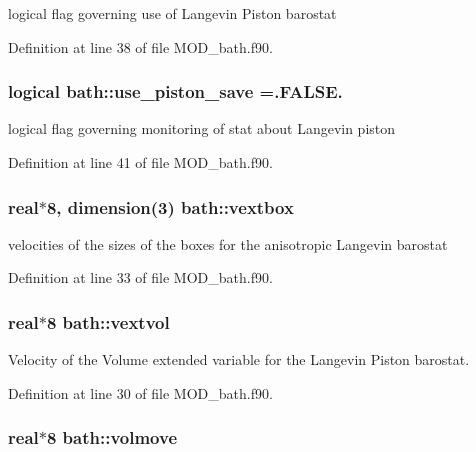 logical flag governing use of Langevin Piston barostat 



Definition at line 38 of file M\-O\-D\-\_\-bath.\-f90.

\hypertarget{classbath_a95eb9a1e66e1b135ed1a51b1f2f590f2}{
\subsubsection[{use\-\_\-piston\-\_\-save}]{\setlength{\rightskip}{0pt plus 5cm}logical bath\-::use\-\_\-piston\-\_\-save =.F\-A\-L\-S\-E.}}\label{classbath_a95eb9a1e66e1b135ed1a51b1f2f590f2}


logical flag governing monitoring of stat about Langevin piston 



Definition at line 41 of file M\-O\-D\-\_\-bath.\-f90.

\hypertarget{classbath_abf4f3dff07da5314ccca397e0915b461}{
\subsubsection[{vextbox}]{\setlength{\rightskip}{0pt plus 5cm}real$\ast$8, dimension(3) bath\-::vextbox}}\label{classbath_abf4f3dff07da5314ccca397e0915b461}


velocities of the sizes of the boxes for the anisotropic Langevin barostat 



Definition at line 33 of file M\-O\-D\-\_\-bath.\-f90.

\hypertarget{classbath_ab58c842917f47d058ccc454f2d86d26e}{
\subsubsection[{vextvol}]{\setlength{\rightskip}{0pt plus 5cm}real$\ast$8 bath\-::vextvol}}\label{classbath_ab58c842917f47d058ccc454f2d86d26e}


Velocity of the Volume extended variable for the Langevin Piston barostat. 



Definition at line 30 of file M\-O\-D\-\_\-bath.\-f90.

\hypertarget{classbath_aa2403c502d6b8f67a5ebf3f1010f6aa4}{
\subsubsection[{volmove}]{\setlength{\rightskip}{0pt plus 5cm}real$\ast$8 bath\-::volmove}}\label{classbath_aa2403c502d6b8f67a5ebf3f1010f6aa4}


